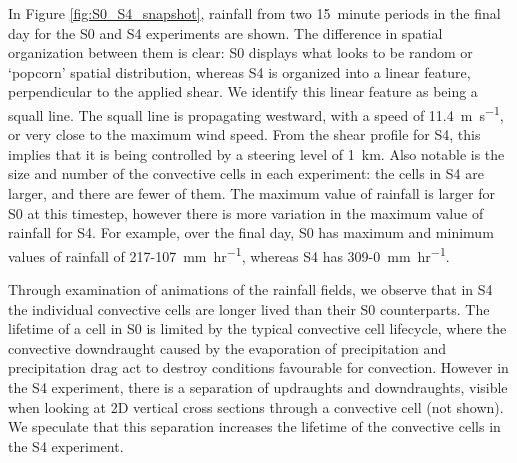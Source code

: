\documentclass[11pt,a4paper]{article}
\begin{document}
%
In Figure \ref{fig:S0_S4_snapshot}, rainfall from two \SI{15}{minute} periods in the final day for the S0 and S4 experiments are shown. The difference in spatial organization between them is clear: S0 displays what looks to be random or `popcorn' spatial distribution, whereas S4 is organized into a linear feature, perpendicular to the applied shear. We identify this linear feature as being a squall line. The squall line is propagating westward, with a speed of \SI{11.4}{m.s^{-1}}, or very close to the maximum wind speed. From the shear profile for S4, this implies that it is being controlled by a steering level of \SI{1}{km}. Also notable is the size and number of the convective cells in each experiment: the cells in S4 are larger, and there are fewer of them. The maximum value of rainfall is larger for S0 at this timestep, however there is more variation in the maximum value of rainfall for S4. For example, over the final day, S0 has maximum and minimum values of rainfall of \SI{217}{}-\SI{107}{mm.hr^{-1}}, whereas S4 has \SI{309}{}-\SI{0}{mm.hr^{-1}}.

Through examination of animations of the rainfall fields, we observe that in S4 the individual convective cells are longer lived than their S0 counterparts. The lifetime of a cell in S0 is limited by the typical convective cell lifecycle, where the convective downdraught caused by the evaporation of precipitation and precipitation drag act to destroy conditions favourable for convection. However in the S4 experiment, there is a separation of updraughts and downdraughts, visible when looking at 2D vertical cross sections through a convective cell (not shown). We speculate that this separation increases the lifetime of the convective cells in the S4 experiment.
\end{document}
